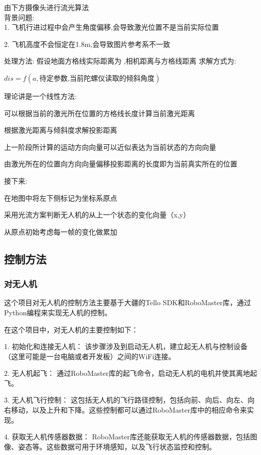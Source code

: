 \documentclass[12pt, a4paper, oneside]{article}
\begin{document}
由下⽅摄像头进⾏流光算法\\
背景问题:\\

1. ⻜机⾏进过程中会产⽣⻆度偏移,会导致激光位置不是当前实际位置

2. ⻜机⾼度不会恒定在1.8m,会导致图⽚参考系不⼀致

处理⽅法:
假设地⾯⽅格线实际距离为 ,相机距离与⽅格线距离 求解⽅式为:

$dis=f(a,\text{待定参数,当前陀螺仪读取的倾斜角度})$

理论讲是⼀个线性⽅法:

可以根据当前的激光所在位置的⽅格线⻓度计算当前激光距离

根据激光距离与倾斜度求解投影距离

上⼀阶段所计算的运动⽅向向量可以近似表达为当前状态的⽅向向量

由激光所在的位置向⽅向向量偏移投影距离的⻓度即为当前真实所在的位置

接下来:

在地图中将左下侧标记为坐标系原点

采⽤光流⽅案判断⽆⼈机的从上⼀个状态的变化向量（x,y）

从原点初始考虑每⼀帧的变化做累加

\subsection{控制方法}

\subsubsection{对无人机}

这个项目对无人机的控制方法主要基于大疆的Tello SDK和RoboMaster库，通过Python编程来实现无人机的控制。

在这个项目中，对无人机的主要控制如下：

1. 初始化和连接无人机： 该步骤涉及到启动无人机，建立起无人机与控制设备（这里可能是一台电脑或者开发板）之间的WiFi连接。

2. 无人机起飞： 通过RoboMaster库的起飞命令，启动无人机的电机并使其离地起飞。

3. 无人机飞行控制： 这包括无人机的飞行路径控制，包括向前、向后、向左、向右移动，以及上升和下降。这些控制都可以通过RoboMaster库中的相应命令来实现。

4. 获取无人机传感器数据： RoboMaster库还能获取无人机的传感器数据，包括图像、姿态等。这些数据可用于环境感知，以及飞行状态监控和控制。
\end{document}
